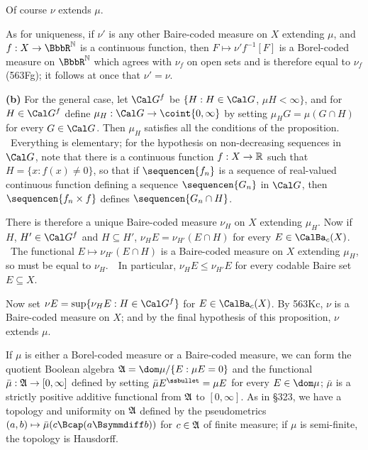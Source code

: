 {

\noindent Of course $\nu$ extends $\mu$.

\medskip

As for uniqueness, if $\nu'$ is any other Baire-coded measure on $X$
extending $\mu$, and $f:X\to\BbbR^{\Bbb N}$ is a continuous function, then
$F\mapsto\nu'f^{-1}[F]$ is a Borel-coded measure on
$\BbbR^{\Bbb N}$ which agrees
with $\nu_f$ on open sets and is therefore equal to $\nu_f$ (563Fg);  
it follows at once that $\nu'=\nu$.

\medskip

{\bf (b)} For the general case, let $\Cal G^f$ be
$\{H:H\in\Cal G$, $\mu H<\infty\}$, and for $H\in\Cal G^f$ define
$\mu_H:\Cal G\to\coint{0,\infty}$ by setting $\mu_HG=\mu(G\cap H)$ for
every $G\in\Cal G$.   Then $\mu_H$ satisfies all the conditions of the
proposition.   \Prf\ Everything is elementary;  for the hypothesis on
non-decreasing sequences in $\Cal G$, note that there is a continuous
function $f:X\to\Bbb R$ such that $H=\{x:f(x)\ne 0\}$, so that
if $\sequencen{f_n}$ is a
sequence of real-valued continuous function defining a sequence
$\sequencen{G_n}$ in $\Cal G$, then $\sequencen{f_n\times f}$ defines
$\sequencen{G_n\cap H}$.\ \Qed

There is therefore a unique Baire-coded measure $\nu_H$ on $X$ extending
$\mu_H$.   Now if $H$, $H'\in\Cal G^f$ and $H\subseteq H'$,
$\nu_HE=\nu_{H'}(E\cap H)$ for every $E\in\CalBa_c(X)$.   \Prf\ The
functional $E\mapsto\nu_{H'}(E\cap H)$ is a Baire-coded measure on $X$
extending $\mu_H$, so must be equal to $\nu_H$.\ \QeD\   In particular,
$\nu_HE\le\nu_{H'}E$ for every codable Baire set $E\subseteq X$.

Now set $\nu E=\sup\{\nu_HE:H\in\Cal G^f\}$ for $E\in\CalBa_c(X)$.
By 563Kc, $\nu$ is a Baire-coded measure on $X$;  and by the final
hypothesis of this proposition, $\nu$ extends $\mu$.
}%

 If $\mu$ is either a Borel-coded measure or
a Baire-coded measure, we can form the quotient Boolean algebra
$\frak A=\dom\mu/\{E:\mu E=0\}$ and the functional
$\bar\mu:\frak A\to[0,\infty]$ defined by setting
$\bar\mu E^{\ssbullet}=\mu E$ for every $E\in\dom\mu$;
$\bar\mu$ is a strictly positive additive functional from $\frak A$ to
$[0,\infty]$.   As in \S323, we have a topology and
uniformity on $\frak A$ defined by the pseudometrics
$(a,b)\mapsto\bar\mu(c\Bcap(a\Bsymmdiff b))$ for $c\in\frak A$ of
finite measure;  if $\mu$ is semi-finite, the topology is Hausdorff.


